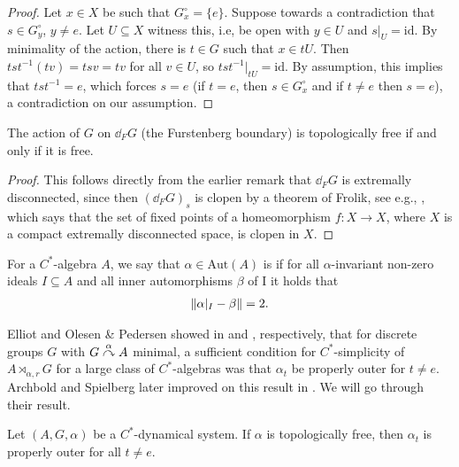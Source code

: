 \begin{proof}
	Let $x \in X$ be such that $G_x^\circ = \{e\}$. Suppose towards a contradiction that $s \in G_y^\circ$, $y \neq e$. Let $U \subseteq X$ witness this, i.e, be open with $y \in U$ and $s|_U=\mathrm{id}$. By minimality of the action, there is $t \in G$ such that $x \in tU$. Then $tst^{-1}(tv) =  tsv = tv$ for all $v \in U$, so $tst^{-1}|_{tU}=  \mathrm{id}$. By assumption, this implies that $tst^{-1} = e$, which forces $s = e$ (if $t = e$, then $s \in G_x^\circ$ and if $t \neq e$ then $s = e$), a contradiction on our assumption.
\end{proof}
\begin{corollary}
	The action of $G$ on $\dd_F G$ (the Furstenberg boundary) is topologically free if and only if it is free.
\end{corollary}
\begin{proof}
	This follows directly from the earlier remark that $\dd_F G$ is extremally disconnected, since then $(\dd_F G)_s$ is clopen by a theorem of Frolik, see e.g., \cite[Theorem 3.1]{frolik1971maps}, which says that the set of fixed points of a homeomorphism $f \colon X \to X$, where $X$ is a compact extremally disconnected space, is clopen in $X$.
\end{proof}
\begin{definition}
	For a $C^*$-algebra $A$, we say that $\alpha \in \mathrm{Aut}(A)$ is  if for all $\alpha$-invariant non-zero ideals $I \subseteq A$ and all inner automorphisms $\beta$ of I it holds that
	\begin{align*}
		\left\lVert \alpha|_I - \beta \right\rVert = 2.
	\end{align*}
\end{definition}
Elliot and Olesen \& Pedersen showed in \cite[Theorem 3.2]{elliott1980some} and \cite[Theorem 7.2]{olesenpedersen3}, respectively, that for discrete groups $G$ with $G \stackrel{\alpha}{\curvearrowright} A$ minimal, a sufficient condition for $C^*$-simplicity of $A \rtimes_{\alpha,r} G$ for a large class of $C^*$-algebras was that $\alpha_t$ be properly outer for $t \neq e$. Archbold and Spielberg later improved on this result in \cite{archbold1994topologically}. We will go through their result. 
\begin{proposition}
	Let $(A,G,\alpha)$ be a $C^*$-dynamical system. If $\alpha$ is topologically free, then $\alpha_t$ is properly outer for all $t \neq e$.
\end{proposition}
